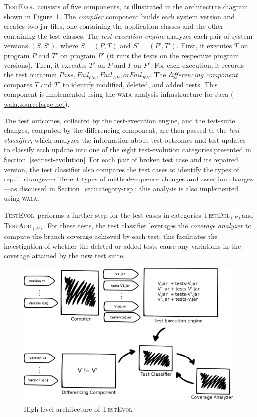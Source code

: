 \documentclass[conference]{IEEEtran}
\newcommand{\mt}{\mathit}
\newcommand{\pass}{\mt{Pass}}
\newcommand{\failce}{\mt{Fail}_{CE}}
\newcommand{\failre}{\mt{Fail}_{RE}}
\newcommand{\failae}{\mt{Fail}_{AE}}
\newcommand{\catdelp}{\textsc{TestDel}$_\mt{(P)}$}
\newcommand{\cataddp}{\textsc{TestAdd}$_\mt{(P)}$}
\newcommand{\tool}{\textsc{TestEvol}\xspace}
\begin{document}
\tool\ consists of five components, as illustrated in the architecture
diagram shown in Figure~\ref{fig:trex}. 
%
The \emph{compiler} component builds each system version and creates
two jar files, one containing the application classes and the other
containing the test classes.
%
The \emph{test-execution engine} analyzes each pair of system versions
$(S, S')$, where $S = (P, T)$ and $S' = (P', T')$.  First, it executes
$T$ on program $P$ and $T'$ on program $P'$ (\ie it runs the tests on
the respective program versions).  Then, it executes $T'$ on $P$ and
$T$ on $P'$. For each execution, it records the test outcome: $\pass,
\failce, \failae, or \failre$.
%
The \emph{differencing component} compares $T$ and $T'$ to identify
modified, deleted, and added tests. This component is implemented
using the \textsc{wala} analysis infrastructure for Java ({\small
  \url{wala.sourceforge.net}}).

The test outcomes, collected by the test-execution engine, and the
test-suite changes, computed by the differencing component, are then
passed to the \emph{test classifier}, which analyzes the information
about test outcomes and test updates to classify each update into one
of the eight test-evolution categories presented in
Section~\ref{sec:test-evolution}.  For each pair of broken test case
and its repaired version, the test classifier also compares the test
cases to identify the types of repair changes---different types of
method-sequence changes and assertion changes---as discussed in
Section~\ref{sec:category-rep}; this analysis is also implemented
using \textsc{wala}.

\tool\ performs a further step for the test cases in categories
\catdelp{}and \cataddp{}. For these tests, the test classifier
leverages the \emph{coverage analyzer} to compute the branch coverage
achieved by each test; this facilitates the investigation of whether
the deleted or added tests cause any variations in the coverage
attained by the new test suite.

\begin{figure}
	\centering
	\includegraphics[width=\columnwidth]{architecture}
        \vspace*{-16pt}
	\caption{High-level architecture of \tool.}
        \vspace*{-8pt}
	\label{fig:trex}
\end{figure}
\end{document}
